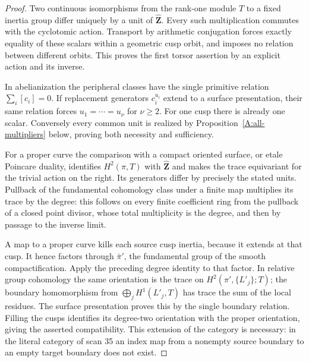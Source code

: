 \begin{proof}
Two continuous isomorphisms from the rank-one module
$T$ to a fixed inertia group differ uniquely by a unit
of $\widehat{\mathbf Z}$.  Every such multiplication
commutes with the cyclotomic action.  Transport by
arithmetic conjugation forces exactly equality of
these scalars within a geometric cusp orbit, and
imposes no relation between different orbits.  This
proves the first torsor assertion by an explicit action
and its inverse.

In abelianization the peripheral classes have the
single primitive relation $\sum_i[c_i]=0$.
If replacement generators $c_i^{u_i}$ extend to a
surface presentation, their same relation forces
$u_1=\cdots=u_\nu$ for $\nu\ge2$.  For one cusp
there is already one scalar.  Conversely every common
unit is realized by Proposition~\ref{A:all-multipliers}
below, proving both necessity and sufficiency.

For a proper curve the comparison with a compact
oriented surface, or etale Poincare duality, identifies
$H^2(\pi,T)$ with $\widehat{\mathbf Z}$ and makes
the trace equivariant for the trivial action on the
right.  Its generators differ by precisely the stated
units.  Pullback of the fundamental cohomology class
under a finite map multiplies its trace by the degree:
this follows on every finite coefficient ring from
the pullback of a closed point divisor, whose total
multiplicity is the degree, and then by passage to the
inverse limit.

A map to a proper curve kills each source cusp
inertia, because it extends at that cusp.  It hence
factors through $\bar\pi'$, the fundamental group
of the smooth compactification.  Apply the preceding
degree identity to that factor.  In relative group
cohomology the same orientation is the trace on
$H^2(\pi',\{L'_j\};T)$; the boundary homomorphism
from $\bigoplus_jH^1(L'_j,T)$ has trace the sum of
the local residues.  The surface presentation proves
this by the single boundary relation.  Filling the
cusps identifies its degree-two orientation with the
proper orientation, giving the asserted compatibility.
This extension of the category is necessary: in the
literal category of scan 35 an index map from a
nonempty source boundary to an empty target boundary
does not exist.
\end{proof}

